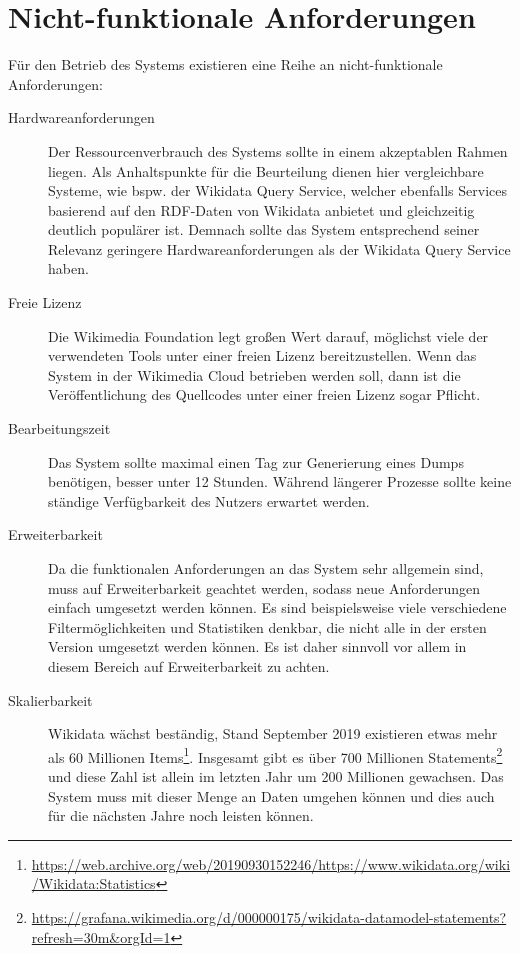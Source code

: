 \section{Nicht-funktionale Anforderungen}
Für den Betrieb des Systems existieren eine Reihe an nicht-funktionale Anforderungen:

\begin{description}
  \item[Hardwareanforderungen] Der Ressourcenverbrauch des Systems sollte in einem akzeptablen Rahmen liegen.
  Als Anhaltspunkte für die Beurteilung dienen hier vergleichbare Systeme, wie bspw. der Wikidata Query Service, welcher ebenfalls Services basierend auf den RDF-Daten von Wikidata anbietet und gleichzeitig deutlich populärer ist. Demnach sollte das System entsprechend seiner Relevanz geringere Hardwareanforderungen als der Wikidata Query Service haben.
\item[Freie Lizenz] Die Wikimedia Foundation legt großen Wert darauf, möglichst viele der verwendeten Tools unter einer freien Lizenz bereitzustellen\cite{wikimedia-guiding-principles}.
  Wenn das System in der Wikimedia Cloud betrieben werden soll, dann ist die Veröffentlichung des Quellcodes unter einer freien Lizenz sogar Pflicht\cite{wikimedia-cloud-tos}.
\item[Bearbeitungszeit] Das System sollte maximal einen Tag zur Generierung eines Dumps benötigen, besser unter 12 Stunden. Während längerer Prozesse sollte keine ständige Verfügbarkeit des Nutzers erwartet werden. 
\item[Erweiterbarkeit] Da die funktionalen Anforderungen an das System sehr allgemein sind, muss auf Erweiterbarkeit geachtet werden, sodass neue Anforderungen einfach umgesetzt werden können. Es sind beispielsweise viele verschiedene Filtermöglichkeiten und Statistiken denkbar, die nicht alle in der ersten Version umgesetzt werden können. Es ist daher sinnvoll vor allem in diesem Bereich auf Erweiterbarkeit zu achten.
\item[Skalierbarkeit] Wikidata wächst beständig, Stand September 2019 existieren etwas mehr als 60 Millionen Items\footnote{\url{https://web.archive.org/web/20190930152246/https://www.wikidata.org/wiki/Wikidata:Statistics}}.
  Insgesamt gibt es über 700 Millionen Statements\footnote{\url{https://grafana.wikimedia.org/d/000000175/wikidata-datamodel-statements?refresh=30m&orgId=1}} und diese Zahl ist allein im letzten Jahr um 200 Millionen gewachsen. Das System muss mit dieser Menge an Daten umgehen können und dies auch für die nächsten Jahre noch leisten können.
\end{description}

